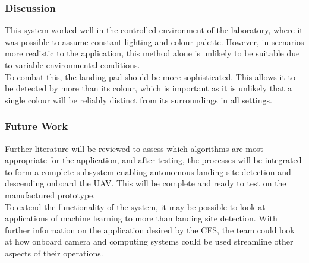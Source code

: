 \subsubsection{Discussion}
This system worked well in the controlled environment of the laboratory, where it was possible to assume constant lighting and colour palette. However, in scenarios more realistic to the application, this method alone is unlikely to be suitable due to variable environmental conditions.\\

To combat this, the landing pad should be more sophisticated. This allows it to be detected by more than its colour, which is important as it is unlikely that a single colour will be reliably distinct from its surroundings in all settings.


\subsubsection{Future Work}

Further literature will be reviewed to assess which algorithms are most appropriate for the application, and after testing, the processes will be integrated to form a complete subsystem enabling autonomous landing site detection and descending onboard the UAV. This will be complete and ready to test on the manufactured prototype.\\

To extend the functionality of the system, it may be possible to look at applications of machine learning to more than landing site detection. With further information on the application desired by the CFS, the team could look at how onboard camera and computing systems could be used streamline other aspects of their operations.